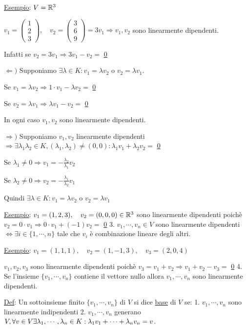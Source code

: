 \documentclass{article}
\begin{document}
   \ul{Esempio}: $V=\mathbb{R}^3$

   $v_1=\begin{pmatrix}1\\2\\3\end{pmatrix},\quad v_2=\begin{pmatrix}3\\6\\9\end{pmatrix}=3v_1\Rightarrow v_1,v_2$ sono linearmente dipendenti.

   Infatti se $v_2=3v_1\Rightarrow3v_1-v_2=$ \ul{0}

   $\Leftarrow)$ Supponiamo $\exists\lambda\in K:v_1=\lambda v_2$ o $v_2=\lambda v_1$.

   Se $v_1=\lambda v_2\Rightarrow1\cdot v_1-\lambda v_2=$ \ul{0}

   Se $v_2=\lambda v_1\Rightarrow\lambda v_1-v_2=$ \ul{0}

   In ogni caso $v_1,v_2$ sono linearmente dipendenti.

   $\Rightarrow)$ Supponiamo $v_1,v_2$ linearmente dipendenti $\Rightarrow\exists\lambda_1\lambda_2\in K,(\lambda_1,\lambda_2)\not=(0,0):\lambda_1v_1+\lambda_2v_2=$ \ul{0}

   Se $\lambda_1\not=0\Rightarrow v_1=-\frac{\lambda_2}{\lambda_1}v_2$

   Se $\lambda_2\not=0\Rightarrow v_2=-\frac{\lambda_1}{\lambda_2}v_1$

   Quindi $\exists\lambda\in K:v_1=\lambda v_2$ o $v_2=\lambda v_1$

   \ul{Esempio}: $v_1=(1,2,3),\quad v_2=(0,0,0)\in\mathbb{R}^3$ sono linearmente dipendenti poichè $v_2=0\cdot v_1\Rightarrow0\cdot v_1+(-1)v_2=$ \ul{0}
3. $v_1,\cdots,v_n\in V$ sono linearmente dipendenti $\Leftrightarrow\exists i\in\{1,\cdots,n\}$ tale che $v_i$ è combinazione lineare degli altri.

   \ul{Esempio}: $v_1=(1,1,1),\quad v_2=(1,-1,3),\quad v_3=(2,0,4)$

   $v_1,v_2,v_3$ sono linearmente dipendenti poichè $v_3=v_1+v_2\Rightarrow v_1+v_2-v_3=$ \ul{0}
4. Se l'insieme $\{v_1,\cdots,v_n\}$ contiene il vettore nullo allora $v_1,\cdots,v_n$ sono linearmente dipendenti.

\ul{Def}: Un sottoinsieme finito $\{v_1,\cdots,v_n\}$ di $V$ si dice \ul{base} di $V$ se:
1. $v_1,\cdots,v_n$ sono linearmente indipendenti
2. $v_1,\cdots,v_n$ generano $V,\forall v\in V\\\exists\lambda_1,\cdots,\lambda_n\in K:\lambda_1v_1+\cdots+\lambda_nv_n=v$.
\end{document}
